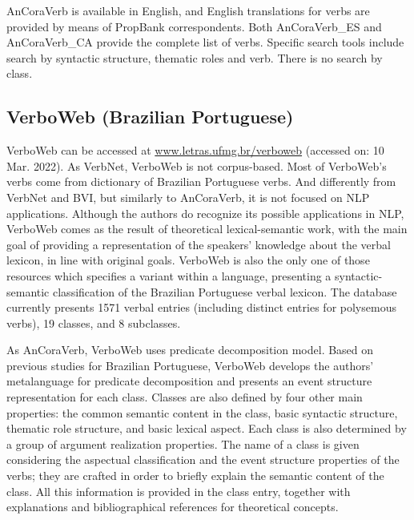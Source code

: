\documentclass[english]{textolivre}
\begin{document}

AnCoraVerb is available in English, and English translations for verbs are provided by means of PropBank correspondents. Both AnCoraVerb\_ES and AnCoraVerb\_CA provide the complete list of verbs. Specific search tools include search by syntactic structure, thematic roles and verb. There is no search by class.

\subsection{VerboWeb (Brazilian Portuguese)}

VerboWeb \cite{cancado_verboweb:_2017} can be accessed at \url{www.letras.ufmg.br/verboweb} (accessed on: 10 Mar. 2022). As VerbNet, VerboWeb is not corpus-based. Most of VerboWeb’s verbs come from  dictionary of Brazilian Portuguese verbs. And differently from VerbNet and BVI, but similarly to AnCoraVerb, it is not focused on NLP applications. Although the authors do recognize its possible applications in NLP, VerboWeb comes as the result of theoretical lexical-semantic work, with the main goal of providing a representation of the speakers’ knowledge about the verbal lexicon, in line with  original goals. VerboWeb is also the only one of those resources which specifies a variant within a language, presenting a syntactic-semantic classification of the Brazilian Portuguese verbal lexicon. The database currently presents 1571 verbal entries (including distinct entries for polysemous verbs), 19 classes, and 8 subclasses.

As AnCoraVerb, VerboWeb uses  predicate decomposition model. Based on previous studies for Brazilian Portuguese, VerboWeb develops the authors’ metalanguage for predicate decomposition and presents an event structure representation for each class. Classes are also defined by four other main properties: the common semantic content in the class, basic syntactic structure, thematic role structure, and basic lexical aspect. Each class is also determined by a group of argument realization properties. The name of a class is given considering the aspectual classification and the event structure properties of the verbs; they are crafted in order to briefly explain the semantic content of the class. All this information is provided in the class entry, together with explanations and bibliographical references for theoretical concepts.
\end{document}
